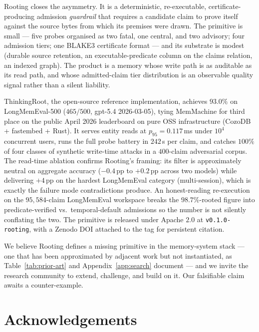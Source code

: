 \documentclass[10pt,a4paper]{article}
\begin{document}
Rooting closes the asymmetry. It is a deterministic, re-executable,
certificate-producing admission \emph{guardrail} that requires a
candidate claim to prove itself against the source bytes from which its
premises were drawn. The primitive is small --- five probes organised as
two fatal, one central, and two advisory; four admission tiers; one
BLAKE3 certificate format --- and its substrate is modest (durable
source retention, an executable-predicate column on the claims
relation, an indexed graph). The product is a memory whose write path
is as auditable as its read path, and whose admitted-claim tier
distribution is an observable quality signal rather than a silent
liability.

ThinkingRoot, the open-source reference implementation, achieves
$\mathbf{93.0\%}$ on LongMemEval-500 ($465/500$, gpt-5.4 2026-03-05),
tying MemMachine for third place on the public April 2026 leaderboard
on pure OSS infrastructure (CozoDB + fastembed + Rust). It serves
entity reads at $p_{95}=0.117$\,ms under $10^{4}$ concurrent users,
runs the full probe battery in $242$\,\textmu s per claim, and catches
$100\%$ of four classes of synthetic write-time attacks in a
$400$-claim adversarial corpus. The read-time ablation confirms
Rooting's framing: its filter is approximately neutral on aggregate
accuracy ($-0.4$\,pp to $+0.2$\,pp across two models) while delivering
$+4$\,pp on the hardest LongMemEval category (multi-session), which is
exactly the failure mode contradictions produce. An honest-reading
re-execution on the $95{,}584$-claim LongMemEval workspace breaks the
$98.7\%$-rooted figure into predicate-verified vs.\ temporal-default
admissions so the number is not silently conflating the two. The
primitive is released under Apache $2.0$ at
\texttt{v0.1.0-rooting}, with a Zenodo DOI attached to the tag for
persistent citation.

We believe Rooting defines a missing primitive in the memory-system
stack --- one that has been approximated by adjacent work but not
instantiated, as Table~\ref{tab:prior-art} and
Appendix~\ref{app:search} document --- and we invite the research
community to extend, challenge, and build on it. Our falsifiable claim
awaits a counter-example.

\section*{Acknowledgements}
\end{document}
